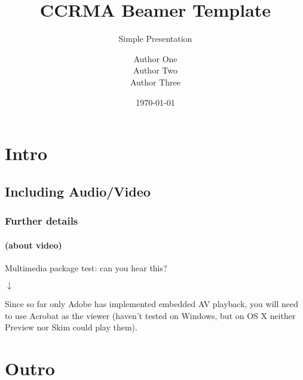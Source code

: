 \documentclass{beamer}
\title{CCRMA Beamer Template}
\subtitle{Simple Presentation}
\author{Author One \\ Author Two \\ Author Three}
\date
\institute[CCRMA]{
    CCRMA\\
    Department of Music\\
    Stanford University%
}
\date{\today}
\begin{document}
\begin{frame}[plain]
    \titlepage
\end{frame}
\addtocounter{framenumber}{-1}  %


\begin{frame}[plain]
    \tableofcontents
\end{frame}
\addtocounter{framenumber}{-1}  %

\section[Intro]{Intro}

\begin{frame}[plain]
    \tableofcontents[currentsection]
\end{frame}
\addtocounter{framenumber}{-1}  %



\subsection[av]{Including Audio/Video}

\begin{frame}\frametitle{Further details}\framesubtitle{(about video)}
{
\centering
Multimedia package test: can you hear this?

$\downarrow$


\scriptsize
Since so far only Adobe has implemented embedded AV playback, you will need to use Acrobat as the viewer (haven't tested on Windows, but on OS X neither Preview nor Skim could play them).
}

\end{frame}


\section[Outro]{Outro}

\begin{frame}[plain]
    \tableofcontents[currentsection]
\end{frame}
\addtocounter{framenumber}{-1}  %
\end{document}
